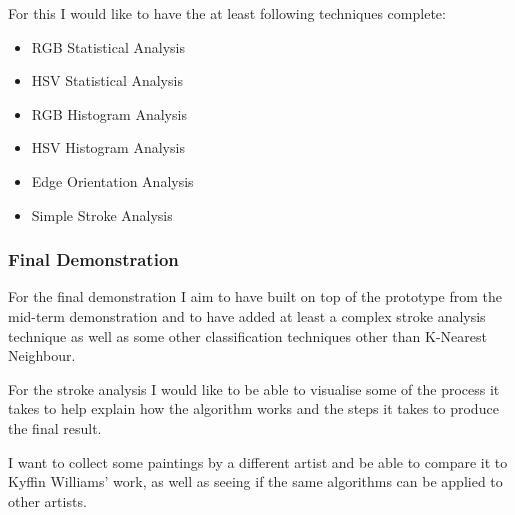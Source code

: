 \documentclass[11pt,fleqn,twoside]{article}
\begin{document}
For this I would like to have the at least following techniques complete:

\begin{itemize}
\item RGB Statistical Analysis
\item HSV Statistical Analysis
\item RGB Histogram Analysis
\item HSV Histogram Analysis
\item Edge Orientation Analysis
\item Simple Stroke Analysis
\end{itemize}

\subsubsection{Final Demonstration}
For the final demonstration I aim to have built on top of the prototype from the mid-term 
demonstration and to have added at least a complex stroke analysis technique as well as some
other classification techniques other than K-Nearest Neighbour.

For the stroke analysis I would like to be able to visualise some of the process it takes to help 
explain how the algorithm works and the steps it takes to produce the final result.

I want to collect some paintings by a different artist and be able to compare it to Kyffin 
Williams' work, as well as seeing if the same algorithms can be applied to other artists.

%


%
%
\end{document}
